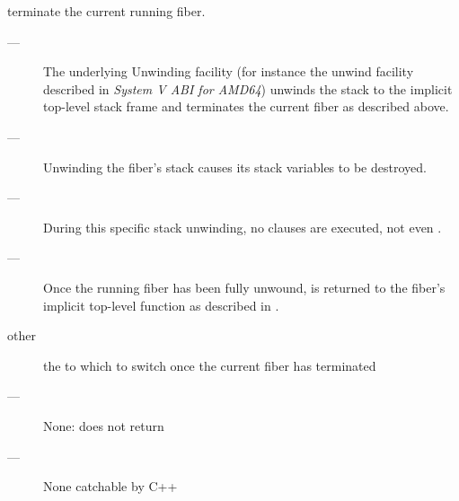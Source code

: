 \effects
terminate the current running fiber.

\remarks
\begin{description}
    \item[---] The underlying Unwinding facility (for instance the unwind facility
               described in \emph{System V ABI for AMD64}) unwinds the stack
               to the implicit top-level stack frame and terminates the
               current fiber as described above.
    \item[---] Unwinding the fiber's stack causes its stack variables to be
               destroyed.
    \item[---] During this specific stack unwinding, 
               no  clauses are executed, not even \catchall.
    \item[---] Once the running fiber has been fully unwound,  is
               returned to the fiber's implicit top-level function as
               described in .
\end{description}

\params
\begin{description}
    \item[other] the \fiber to which to switch once the current fiber has terminated
\end{description}

\returns
\begin{description}
    \item[---] None: \unwindfib does not return
\end{description}

\except
\begin{description}
    \item[---] None catchable by C++
\end{description}
